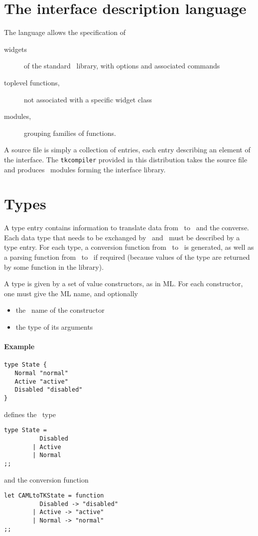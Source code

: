 \section{The interface description language}
The language allows the specification of
\begin{description}
\item[widgets] of the standard \tk\ library, with options and associated commands
\item[toplevel functions,] not associated with a specific widget class
\item[modules,] grouping families of functions.
\end{description} 

A source file is simply a collection of entries, each entry describing an
element of the interface. The {\tt tkcompiler} provided in this distribution
takes the source file and produces \caml\ modules forming the interface
library.

\section{Types}
A type entry contains information to translate data from \caml\ to \tk\ 
and the converse. Each data type that needs to be exchanged by \caml\ and
\tk\ must be described by a type entry. For each type, a conversion function
from \caml\ to \tk\ is generated, as well as a parsing function from \tk\ to
\caml\ if required (because values of the type are returned by some
function in the library).

A type is given by a set of value constructors, as in ML. For each
constructor, one must give the ML name, and optionally
\begin{itemize}
\item the \tk\ name of the constructor
\item the type of its arguments
\end{itemize} 

\paragraph{Example}
\begin{verbatim}
type State { 
   Normal "normal"
   Active "active"
   Disabled "disabled"
}
\end{verbatim} 
defines the \caml\ type
\begin{verbatim}
type State =
          Disabled
        | Active
        | Normal
;;
\end{verbatim} 
and the conversion function
\begin{verbatim}
let CAMLtoTKState = function
          Disabled -> "disabled"
        | Active -> "active"
        | Normal -> "normal"
;;
\end{verbatim} 

